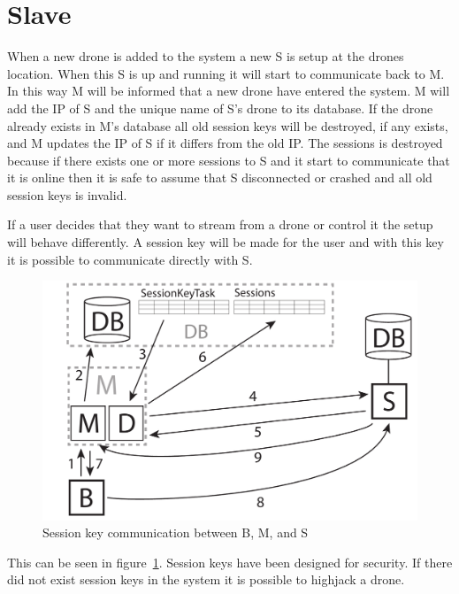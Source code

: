 \section{Slave}
\label{sec:design_slave}


When a new drone is added to the system a new S is setup at the drones location. When this S is up and running it will start to communicate back to M. In this way M will be informed that a new drone have entered the system. M will add the IP of S and the unique name of S's drone to its database.
If the drone already exists in M's database all old session keys will be destroyed, if any exists, and M updates the IP of S if it differs from the old IP. The sessions is destroyed because if there exists one or more sessions to S and it start to communicate that it is online then it is safe to assume that S disconnected or crashed and all old session keys is invalid.

If a user decides that they want to stream from a drone or control it the setup will behave differently. A session key will be made for the user and with this key it is possible to communicate directly with S.

\begin{figure}[htb]
    \centering 
    \includegraphics[width=\textwidth]{gfx/sessionkey_communication.pdf}
    \caption{Session key communication between B, M, and S}
    \label{fig:sessionkey_communication}
\end{figure}

This can be seen in figure~\ref{fig:sessionkey_communication}. Session keys have been designed for security. If there did not exist session keys in the system it is possible to highjack a drone.

